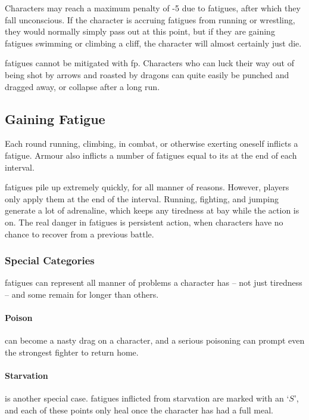\begin{multicols}{2}
\begin{boxtable}[lllllllllX]
\end{boxtable}

Characters may reach a maximum penalty of -5 due to \glspl{fatigue}, after which they fall unconscious.
If the character is accruing \glspl{fatigue} from running or wrestling, they would normally simply pass out at this point, but if they are gaining \glspl{fatigue} swimming or climbing a cliff, the character will almost certainly just die.

\Glspl{fatigue} cannot be mitigated with \gls{fp}. Characters who can luck their way out of being shot by arrows and roasted by dragons can quite easily be punched and dragged away, or collapse after a long run.

\subsection{Gaining Fatigue}

\noindent
Each round running, climbing, in combat, or otherwise exerting oneself inflicts a \gls{fatigue}.
Armour also inflicts a number of \glspl{fatigue} equal to its  at the end of each interval.

\Glspl{fatigue} pile up extremely quickly, for all manner of reasons.
However, players only apply them at the end of the interval.
Running, fighting, and jumping generate a lot of adrenaline, which keeps any tiredness at bay while the action is on.
The real danger in \glspl{fatigue} is persistent action, when characters have no chance to recover from a previous battle.

\subsubsection{Special Categories}

\Glspl{fatigue} can represent all manner of problems a character has -- not just tiredness -- and some remain for longer than others.

\paragraph{Poison} can become a nasty drag on a character, and a serious poisoning can prompt even the strongest fighter to return home.

\paragraph{Starvation} is another special case.
\glspl{fatigue} inflicted from starvation are marked with an `$S$', and each of these points only heal once the character has had a full meal.

\end{multicols}


